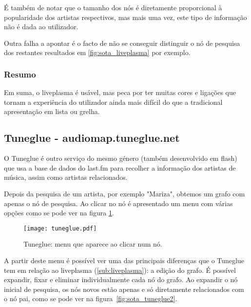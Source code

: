 É também de notar que o tamanho dos nós é diretamente proporcional à popularidade dos artistas respectivos, mas mais uma vez, este tipo de informação não é dada ao utilizador.

Outra falha a apontar é o facto de não se conseguir distinguir o nó de pesquisa dos restantes resultados em \ref{fig:sota_liveplasma} por exemplo.


\subsubsection{Resumo} %
\label{ssub:liveplasma_resumo}

Em suma, o liveplasma é usável, mas peca por ter muitas cores e ligações que tornam a experiência do utilizador ainda mais difícil do que a tradicional apresentação em lista ou grelha.



\subsection{Tuneglue - audiomap.tuneglue.net} %
\label{sub:tuneglue}

O Tuneglue é outro serviço do mesmo género (também desenvolvido em flash) que usa a base de dados do last.fm para recolher a informação dos artistas de música, assim como artistas relacionados.

Depois da pesquisa de um artista, por exemplo "Mariza", obtemos um grafo com apenas o nó de pesquisa. Ao clicar no nó é apresentado um menu com várias opções como se pode ver na figura \ref{fig:sota_tuneglue}.

\begin{figure}[tb]
  \begin{center}
    \texttt{[image: tuneglue.pdf]}
  \end{center}
  \caption{Tuneglue: menu que aparece ao clicar num nó.}
  \label{fig:sota_tuneglue}
\end{figure}

A partir deste menu é possível ver uma das principais diferenças que o Tuneglue tem em relação ao liveplasma (\ref{sub:liveplasma}): a edição do grafo.
É possível expandir, fixar e eliminar individualmente cada nó do grafo.
Ao expandir o nó inicial de pesquisa, os nós novos estão apenas e só diretamente relacionados com o nó pai, como se pode ver na figura~\ref{fig:sota_tuneglue2}.

